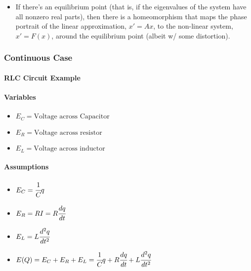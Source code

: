 \documentclass[11pt]{article}
\providecommand{\tightlist}{%
      \setlength{\itemsep}{0pt}\setlength{\parskip}{0pt}}
\begin{document}
\begin{itemize}
\tightlist
\item
  If there's an equilibrium point (that is, if the eigenvalues of the
  system have all nonzero real parts), then there is a homeomorphism
  that maps the phase portrait of the linear approximation, \(x' = Ax\),
  to the non-linear system, \(x' = F(x)\), around the equilibrium point
  (albeit w/ some distortion).
\end{itemize}

\hypertarget{continuous-case}{%
\subsubsection{Continuous Case}\label{continuous-case}}

\hypertarget{rlc-circuit-example}{%
\paragraph{RLC Circuit Example}\label{rlc-circuit-example}}

    \hypertarget{variables}{%
\paragraph{Variables}\label{variables}}

\begin{itemize}
\tightlist
\item
  \(E_C = \text{Voltage across Capacitor}\)\\
\item
  \(E_R = \text{Voltage across resistor}\)\\
\item
  \(E_L = \text{Voltage across inductor}\)
\end{itemize}

\hypertarget{assumptions}{%
\paragraph{Assumptions}\label{assumptions}}

\begin{itemize}
\item
  \(E_C = \cfrac{1}{C} q\)
\item
  \(E_R = RI = R \cfrac{dq}{dt}\)
\item
  \(E_L = L \cfrac{d^2q}{dt^2}\)
\item
  \(E(Q) = E_C + E_R + E_L = \cfrac{1}{C} q + R \cfrac{dq}{dt} + L \cfrac{d^2q}{dt^2}\)
\end{itemize}
\end{document}
